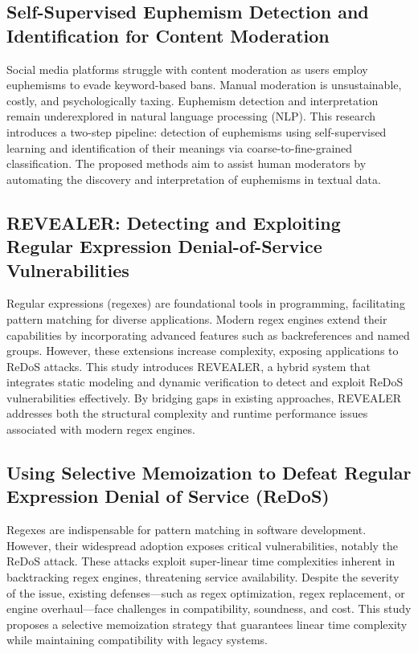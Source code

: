 \documentclass[conference]{IEEEtran}
\begin{document}
\subsection{\textbf{Self-Supervised Euphemism Detection and Identification for Content Moderation}}
Social media platforms struggle with content moderation as users employ euphemisms to evade keyword-based bans. Manual moderation is unsustainable, costly, and psychologically taxing. Euphemism detection and interpretation remain underexplored in natural language processing (NLP). This research introduces a two-step pipeline: detection of euphemisms using self-supervised learning and identification of their meanings via coarse-to-fine-grained classification. The proposed methods aim to assist human moderators by automating the discovery and interpretation of euphemisms in textual data.

\subsection{\textbf{REVEALER: Detecting and Exploiting Regular Expression Denial-of-Service Vulnerabilities}}
Regular expressions (regexes) are foundational tools in programming, facilitating pattern matching for diverse applications. Modern regex engines extend their capabilities by incorporating advanced features such as backreferences and named groups. However, these extensions increase complexity, exposing applications to ReDoS attacks. This study introduces REVEALER, a hybrid system that integrates static modeling and dynamic verification to detect and exploit ReDoS vulnerabilities effectively. By bridging gaps in existing approaches, REVEALER addresses both the structural complexity and runtime performance issues associated with modern regex engines.

\subsection{\textbf{Using Selective Memoization to Defeat Regular Expression Denial of Service (ReDoS)}}
Regexes are indispensable for pattern matching in software development. However, their widespread adoption exposes critical vulnerabilities, notably the ReDoS attack. These attacks exploit super-linear time complexities inherent in backtracking regex engines, threatening service availability. Despite the severity of the issue, existing defenses—such as regex optimization, regex replacement, or engine overhaul—face challenges in compatibility, soundness, and cost. This study proposes a selective memoization strategy that guarantees linear time complexity while maintaining compatibility with legacy systems.
\end{document}
